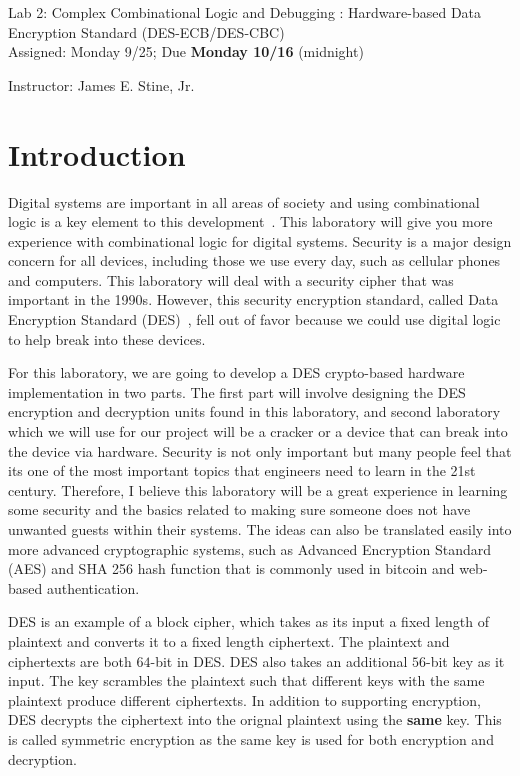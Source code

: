 \documentclass{article}
\newcommand{\myassignment}{Lab 2: Complex Combinational Logic and Debugging : Hardware-based Data Encryption Standard (DES-ECB/DES-CBC)}
\newcommand{\myduedate}{Assigned: Monday 9/25; Due \textbf{Monday 10/16} (midnight)}
\newcommand{\myinstructor}{Instructor: James E. Stine, Jr.}
\begin{document}
\begin{center}
  {\huge \myassignment} \\
  {\large \myduedate} \\
  \begin{flushright}
  \myinstructor \\
  \end{flushright}
\end{center}

\section{Introduction}

Digital systems are important in all areas of society and using
combinational logic is a key element to this
development~\cite{ddca-riscv}.  This
laboratory will give you more experience with combinational logic
for digital systems.  
Security is a major design concern for all devices, including those  we
use every day, such as cellular phones and computers.
This laboratory will deal with a security cipher that was important in
the 1990s.  However, this security encryption standard, called Data
Encryption Standard (DES)~\cite{fips463, Biryukov2005}, fell out of
favor because we
could use
digital logic to help break into these devices.

For this laboratory, we are going to develop a DES crypto-based
hardware implementation
in two parts.  The first part will involve designing the
DES encryption and decryption units found in this laboratory,
and second laboratory which we will
use for our project will be a cracker or a
device that can break into the device via hardware.
Security is not only important but many people feel that its one of the most important
topics that engineers
need to learn in the 21st century.  Therefore, I
believe this laboratory will be a great experience in learning some
security and the basics related to making sure someone does not have
unwanted guests within their systems.  The ideas can also be
translated easily into more advanced cryptographic systems, such as
Advanced Encryption Standard (AES) and SHA 256 hash function that is
commonly used in bitcoin and web-based authentication.

DES is an example of a block cipher, which takes as its input a fixed
length of plaintext and converts it to a fixed length ciphertext.
The plaintext and ciphertexts are both $64$-bit in DES.  DES also
takes an additional $56$-bit key as it input.  The key scrambles the
plaintext such that different keys with the same plaintext produce
different ciphertexts.  In addition to supporting encryption,
DES decrypts the ciphertext into the orignal plaintext using the \textbf{same}
key.  This is called symmetric encryption as the same key is used
for both encryption and decryption.
\end{document}
